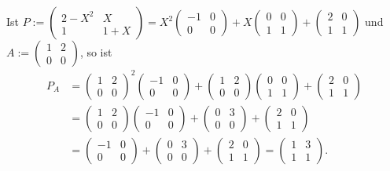 \documentclass[../../main.tex]{subfiles}
\begin{document}
\begin{bsp}\label{17.4.6} Ist $P:=\begin{pmatrix}2-X^2&X\\ 1&1+X\end{pmatrix}=X^2\begin{pmatrix}-1&0\\0&0\end{pmatrix}+X\begin{pmatrix}0&0\\1&1\end{pmatrix}+\begin{pmatrix}2&0\\1&1\end{pmatrix}$ und $A:=\begin{pmatrix}1&2\\0&0\end{pmatrix}$, so ist
\begin{align*}
P_A&=\begin{pmatrix}1&2\\0&0\end{pmatrix}^2\begin{pmatrix}-1&0\\0&0\end{pmatrix}+\begin{pmatrix}1&2\\0&0\end{pmatrix}\begin{pmatrix}0&0\\1&1\end{pmatrix}+\begin{pmatrix}2&0\\1&1\end{pmatrix}\\
&=\begin{pmatrix}1&2\\0&0\end{pmatrix}\begin{pmatrix}-1&0\\0&0\end{pmatrix}+\begin{pmatrix}0&3\\0&0\end{pmatrix}+\begin{pmatrix}2&0\\1&1\end{pmatrix}
\\
&=\begin{pmatrix}-1&0\\0&0\end{pmatrix}+\begin{pmatrix}0&3\\0&0\end{pmatrix}+\begin{pmatrix}2&0\\1&1\end{pmatrix}=\begin{pmatrix}1&3\\1&1\end{pmatrix}.
\end{align*}
\end{bsp}
\end{document}
